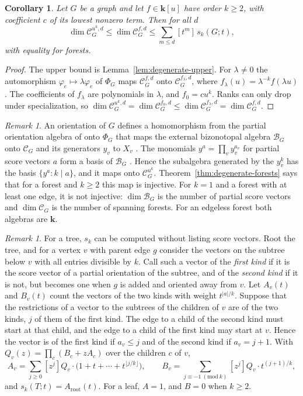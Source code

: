 \documentclass[reqno]{article}
\theoremstyle{plain} %
\newtheorem{corollary}[theorem]{Corollary}
\theoremstyle{definition}
\theoremstyle{remark}
\newtheorem{remark}[theorem]{\sc Remark}
\newcommand{\K} {\mathbf{k}}
\newcommand {\CC}{\mathscr{C}}
\numberwithin{equation}{section}
\begin{document}
\begin{corollary}\label{cor:degenerate-bounds}
Let $G$ be a graph and let $f\in\K[u]$ have order $k\ge2$, with
coefficient $c$ of its lowest nonzero term. Then for all $d$
\[
 \dim\CC_G^{u^k,d}\le\dim\CC_G^{f,d}\le\sum_{m\le d}[t^m]\,s_k(G;t),
\]
with equality for forests.
\end{corollary}
\begin{proof}
The upper bound is Lemma~\ref{lem:degenerate-upper}. For $\lambda\ne0$
the automorphism $\varphi_e\mapsto\lambda\varphi_e$ of $\Phi_G$ maps
$\CC_G^{f,d}$ onto $\CC_G^{f_\lambda,d}$, where
$f_\lambda(u)=\lambda^{-k}f(\lambda u)$. The coefficients of $f_\lambda$
are polynomials in $\lambda$, and $f_0=cu^k$. Ranks can only drop under
specialization, so
$\dim\CC_G^{u^k,d}=\dim\CC_G^{f_0,d}\le\dim\CC_G^{f_\lambda,d}=\dim\CC_G^{f,d}$.
\end{proof}

\begin{remark}\label{rem:degenerate-bizonotopal}
An orientation of $G$ defines a homomorphism from the partial orientation
algebra of \cite{KNSV} onto $\Phi_G$ that maps the external bizonotopal
algebra $\mathcal B_G$ onto $\CC_G$ and its generators $y_v$ to $X_v$
\cite[Section~2]{KNSV}. The monomials $y^a=\prod_vy_v^{a_v}$ for partial
score vectors $a$ form a basis of $\mathcal B_G$
\cite[Proposition~2.5]{KNSV}. Hence the subalgebra generated by the
$y_v^k$ has the basis $\{y^a:k\mid a\}$, and it maps onto $\CC_G^{u^k}$.
Theorem~\ref{thm:degenerate-forests} says that for a forest and $k\ge2$
this map is injective. For $k=1$ and a forest with at least one edge, it is not injective:
$\dim\mathcal B_G$ is the
number of partial score vectors and $\dim\CC_G$ is the number of spanning
forests. For an edgeless forest both algebras are $\K$.
\end{remark}

\begin{remark}\label{rem:degenerate-recursion}
For a tree, $s_k$ can be computed without listing score vectors. Root
the tree, and for a vertex $v$ with parent edge $g$ consider the vectors
on the subtree below $v$ with all entries divisible by $k$. Call such a
vector of the \emph{first kind} if it is the score vector of a partial
orientation of the subtree, and of the \emph{second kind} if it is not,
but becomes one when $g$ is added and oriented away from $v$. Let
$A_v(t)$ and $B_v(t)$ count the vectors of the two kinds with weight
$t^{|a|/k}$. Suppose that the restrictions of a vector to the subtrees of
the children of $v$ are of the two kinds, $j$ of them of the first kind.
The edge to a child of the second kind must start at that child, and the
edge to a child of the first kind may start at $v$. Hence the vector is
of the first kind if $a_v\le j$ and of the second kind if $a_v=j+1$.
With $Q_v(z)=\prod_c(B_c+zA_c)$ over the children $c$ of $v$,
\[
 A_v=\sum_{j\ge0}[z^j]Q_v\cdot\bigl(1+t+\cdots+t^{\lfloor j/k\rfloor}\bigr),
 \qquad
 B_v=\sum_{j\equiv-1\ (\mathrm{mod}\ k)}[z^j]Q_v\cdot t^{(j+1)/k},
\]
and $s_k(T;t)=A_{\mathrm{root}}(t)$. For a leaf, $A=1$, and $B=0$ when
$k\ge2$.
\end{remark}
\end{document}
